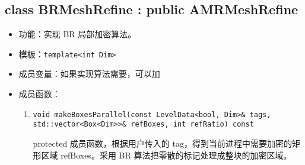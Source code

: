 \documentclass[cn, bibend=bibtex]{elegantpaper}
\theoremstyle{plain}
\begin{document}
\subsection{class BRMeshRefine : public AMRMeshRefine}

\begin{itemize}
  \item 功能：实现 BR 局部加密算法。
  \item 模板：\lstinline|template<int Dim>|
  \item 成员变量：如果实现算法需要，可以加
  \item 成员函数：
  \begin{enumerate}

    \item \lstinline |void makeBoxesParallel(const LevelData<bool, Dim>& tags, std::vector<Box<Dim>>& refBoxes, int refRatio) const|
    
    protected 成员函数，根据用户传入的 tag，得到当前进程中需要加密的矩形区域 refBoxes。采用 BR 算法把零散的标记处理成整块的加密区域。
  \end{enumerate}
\end{itemize}



\end{document}
